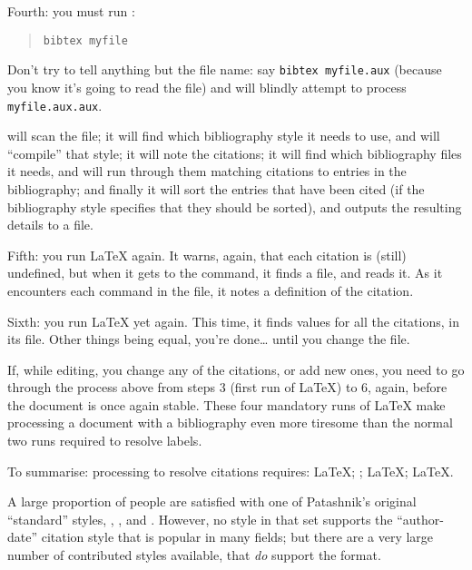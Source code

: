Fourth: you must run \BibTeX{}:
\begin{quote}
\begin{verbatim}
bibtex myfile
\end{verbatim}
\end{quote}
Don't try to tell \BibTeX{} anything but the file name: say
\texttt{bibtex myfile.aux} (because you know it's going to read the
 file) and \BibTeX{} will blindly attempt to process
\texttt{myfile.aux.aux}.

\BibTeX{} will scan the  file; it will find which bibliography
style it needs to use, and will ``compile'' that style; it will note
the citations; it will find which bibliography files it needs, and
will run through them matching citations to entries in the
bibliography; and finally it will sort the entries that have been
cited (if the bibliography style specifies that they should be
sorted), and outputs the resulting details to a  file.

Fifth: you run \LaTeX{} again.  It warns, again, that each citation is
(still) undefined, but when it gets to the  command,
it finds a  file, and reads it.  As it encounters each
 command in the file, it notes a definition of the
citation.

Sixth: you run \LaTeX{} yet again.  This time, it finds values for all
the citations, in its  file.  Other things being equal, you're
done\dots{} until you change the file.

If, while editing, you change any of the citations, or add new ones,
you need to go through the process above from steps 3 (first run of
\LaTeX{}) to 6, again, before the document is once again stable.
These four mandatory runs of \LaTeX{} make processing a document with
a bibliography even more tiresome than the normal two runs required to
resolve labels.

To summarise: processing to resolve citations requires: \LaTeX{};
\BibTeX{}; \LaTeX{}; \LaTeX{}.


A large proportion of people are satisfied with one of Patashnik's
original ``standard'' styles, , ,
 and .  However, no style in that set
supports the ``author-date'' citation style that is popular in many
fields; but there are a very large number of contributed styles
available, that \emph{do} support the format.

